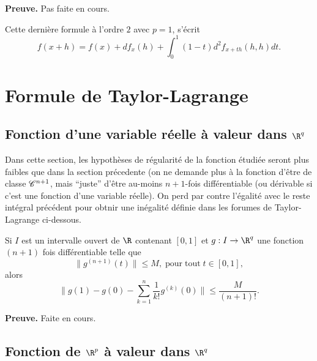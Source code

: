 \documentclass[class=report,crop=false]{standalone}
\begin{document}
{\textbf{Preuve.}} Pas faite en cours.

\begin{remarque*}
\textcolor[rgb]{0.00,0.00,1.00}{
  Cette derni\`ere formule \`a l'ordre $2$ avec $p=1$, s'\'ecrit
  \begin{equation*}
    f(x+h)=f(x)+df_x(h)+ \displaystyle \int_0^1 (1-t)d^2f_{x+th}(h,h)dt.
  \end{equation*}}
\end{remarque*}




\section{Formule de Taylor-Lagrange}
\subsection{Fonction d'une variable r\'eelle \`a valeur dans $\R^q$}

\noindent Dans cette section, les hypothèses de régularité de la fonction étudiée seront plus faibles que dans la section précedente (on ne demande plus à la fonction d'être de classe $\mathscr{C}^{n+1}$, mais ``juste'' d'être au-moins $n+1$-fois différentiable (ou dérivable si c'est une fonction d'une variable réelle). On perd par contre l'égalité avec le reste intégral précédent pour obtnir une inégalité définie dans les forumes de Taylor-Lagrange ci-dessous.


\begin{proposition}
\textcolor[rgb]{0.44,0.00,0.87}{
  Si $I$ est un intervalle ouvert de $\R$ contenant $[0,1]$ et $g: I \rightarrow \R^q$
  une fonction $(n+1)$ fois diff\'erentiable telle que
  \begin{equation*}
    \|g^{(n+1)}(t)\| \leq M,\;\mathrm{pour\; tout\;} t\in [0,1],
  \end{equation*}
  alors
  \begin{equation*}
    \|g(1)-g(0)-\displaystyle \sum_{k=1}^n \dfrac{1}{k!}g^{(k)}(0)\| \leq \dfrac{M}{(n+1) !}.
  \end{equation*}}
\end{proposition}

{\textbf{Preuve.}} Faite en cours.

\subsection{Fonction de $\R^p$ \`a valeur dans $\R^q$}
\end{document}
